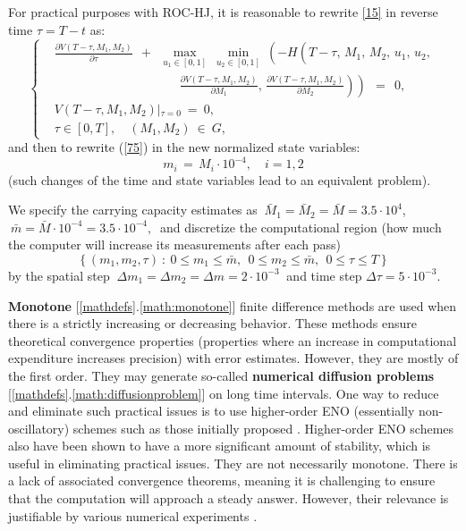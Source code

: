 \documentclass[11pt]{amsart}
\begin{document}
For practical purposes with ROC-HJ, it is reasonable to rewrite \cref{15} in reverse
time $ \tau = T - t $ as:
\begin{equation}
\left\{ \begin{aligned}
& \frac{\partial V(T - \tau, M_1, M_2)}{\partial \tau} \:\: + \:\:
\max_{u_1 \in [0, 1]} \: \min_{u_2 \in [0, 1]} \:
\left( -H \left( T - \tau, \, M_1, \, M_2, \, u_1, \, u_2, 
{}^{{}^{{}^{{}^{{}^{}}}}} \right. \right. \\
& \qquad\qquad\qquad\qquad\qquad
\left. \left. \frac{\partial V(T - \tau, M_1, M_2)}{\partial M_1}, \,
\frac{\partial V(T - \tau, M_1, M_2)}{\partial M_2} \right) \right) \:\: =
\:\: 0, \\
& V(T - \tau, M_1, M_2) \left|_{\tau = 0} \right. \: = \: 0, \\
& \tau \in [0, T], \quad (M_1, M_2) \: \in \: G,
\end{aligned} \right.  \label{75}
\end{equation}
and then to rewrite (\ref{75}) in the new normalized state variables:
\begin{equation}
m_i \, = \, M_i \cdot 10^{-4}, \quad i = 1,2  \label{75_1}
\end{equation}
(such changes of the time and state variables lead to an equivalent problem).


We specify the carrying capacity estimates as $ \: \bar{M}_1 = \bar{M}_2 =
\bar{M} = 3.5 \cdot 10^4 $,
$ \: \bar{m} = \bar{M} \cdot 10^{-4} = 3.5 \cdot 10^{-4}, \: $ and 
discretize the computational region (how much the computer will increase its measurements after each pass)
$$
\left\{ (m_1, m_2, \tau) \: \colon \: 0 \leqslant m_1 \leqslant \bar{m}, \:\: 0
\leqslant m_2 \leqslant \bar{m}, \:\:
0 \leqslant \tau \leqslant T \right\}
$$
by the spatial step $ \: \Delta m_1 = \Delta m_2 = \Delta m = 2 \cdot 10^{-3}
\: $ and time step $ \Delta \tau = 5 \cdot 10^{-3} $.

\textbf{Monotone} [\ref{mathdefs}.\ref{math:monotone}] finite difference methods are used when there is a strictly increasing or decreasing behavior.
These methods ensure theoretical convergence properties (properties where an increase in computational expenditure increases precision) with error estimates. However, they are mostly of the first order. They may generate so-called 
\textbf{numerical diffusion problems} [\ref{mathdefs}.\ref{math:diffusionproblem}]
on long time intervals. One way to reduce and eliminate such practical issues is to use 
higher-order ENO (essentially non-oscillatory) schemes 
such as those initially proposed \cite{OsherShu1991}. Higher-order ENO schemes also have been shown to have a more significant amount of stability, which is useful in eliminating practical issues. They are not necessarily
monotone. There is a lack of associated convergence theorems, meaning it is challenging to ensure that the computation will approach a steady answer. However,
their relevance is justifiable by various numerical experiments 
\cite{OsherShu1991,BokanForcadelZidani2010}.
\end{document}
